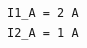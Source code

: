 \documentclass[border=12pt]{standalone}
\begin{document}
\begin{lstlisting}[style=output]
I1_A = 2 A
I2_A = 1 A
\end{lstlisting}
\end{document}
